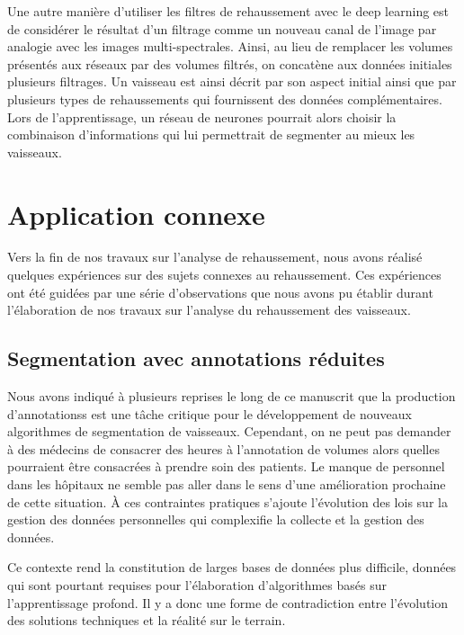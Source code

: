Une autre manière d'utiliser les filtres de rehaussement avec le deep learning est de considérer le résultat d'un filtrage comme un nouveau canal de l’image par analogie avec les images multi-spectrales. Ainsi, au lieu de remplacer les volumes présentés aux réseaux par des volumes filtrés, on concatène aux données initiales plusieurs filtrages. Un vaisseau est ainsi décrit par son aspect initial ainsi que par plusieurs types de rehaussements qui fournissent des données complémentaires. Lors de l'apprentissage, un réseau de neurones pourrait alors choisir la combinaison d'informations qui lui permettrait de segmenter au mieux les vaisseaux. 

\section{Application connexe}

Vers la fin de nos travaux sur l'analyse de rehaussement, nous avons réalisé quelques expériences sur des sujets connexes au rehaussement. Ces expériences ont été guidées par une série d'observations que nous avons pu établir durant l'élaboration de nos travaux sur l'analyse du rehaussement des vaisseaux.

\subsection{Segmentation avec annotations réduites}

Nous avons indiqué à plusieurs reprises le long de ce manuscrit que la production d'annotationss est une tâche critique pour le développement de nouveaux algorithmes de segmentation de vaisseaux. Cependant, on ne peut pas demander à des médecins de consacrer des heures à l'annotation de volumes alors quelles pourraient être consacrées à prendre soin des patients. Le manque de personnel dans les hôpitaux ne semble pas aller dans le sens d'une amélioration prochaine de cette situation. À ces contraintes pratiques s'ajoute l'évolution des lois sur la gestion des données personnelles qui complexifie la collecte et la gestion des données. 

Ce contexte rend la constitution de larges bases de données plus difficile, données qui sont pourtant requises pour l'élaboration d'algorithmes basés sur l'apprentissage profond. Il y a donc une forme de contradiction entre l'évolution des solutions techniques et la réalité sur le terrain.  

